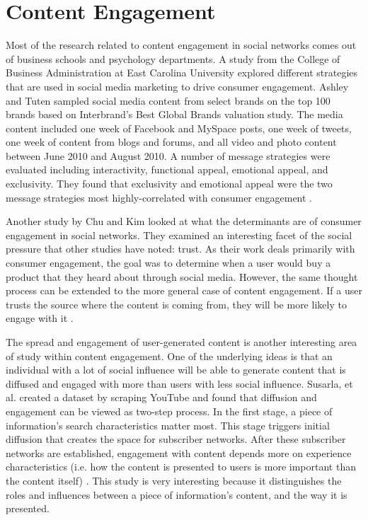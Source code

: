 \section{Content Engagement} \label{ch:engagement}
Most of the research related to content engagement in social networks comes out of business schools and psychology departments.  A study from the College of Business Administration at East Carolina University explored different strategies that are used in social media marketing to drive consumer engagement.  Ashley and Tuten sampled social media content from select brands on the top 100 brands based on Interbrand's Best Global Brands valuation study.  The media content included one week of Facebook and MySpace posts, one week of tweets, one week of content from blogs and forums, and all video and photo content between June 2010 and August 2010.  A number of message strategies were evaluated including interactivity, functional appeal, emotional appeal, and exclusivity.  They found that exclusivity and emotional appeal were the two message strategies most highly-correlated with consumer engagement \cite{ecu}.

Another study by Chu and Kim looked at what the determinants are of consumer engagement in social networks.  They examined an interesting facet of the social pressure that other studies have noted: trust.  As their work deals primarily with consumer engagement, the goal was to determine when a user would buy a product that they heard about through social media.  However, the same thought process can be extended to the more general case of content engagement.  If a user trusts the source where the content is coming from, they will be more likely to engage with it \cite{chu}.

The spread and engagement of user-generated content is another interesting area of study within content engagement.  One of the underlying ideas is that an individual with a lot of social influence will be able to generate content that is diffused and engaged with more than users with less social influence.  Susarla, et al. created a dataset by scraping YouTube and found that diffusion and engagement can be viewed as two-step process.  In the first stage, a piece of information's search characteristics matter most.  This stage triggers initial diffusion that creates the space for subscriber networks.  After these subscriber networks are established, engagement with content depends more on experience characteristics (i.e. how the content is presented to users is more important than the content itself) \cite{susarla}.  This study is very interesting because it distinguishes the roles and influences between a piece of information's content, and the way it is presented.

